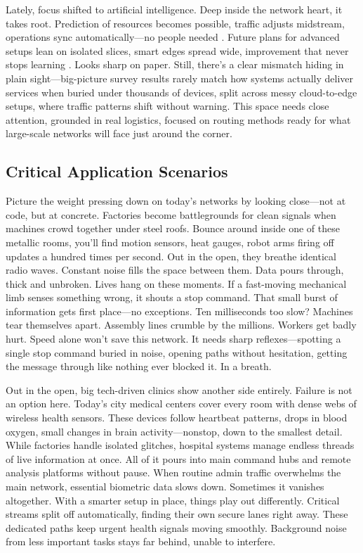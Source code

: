 \documentclass[a4paper,fleqn]{cas-dc}
\numberwithin{equation}{section}
\begin{document}
Lately, focus shifted to artificial intelligence. Deep inside the network heart, it takes root. Prediction of resources becomes possible, traffic adjusts midstream, operations sync automatically—no people needed \cite{Le2023Applications,Mokh2024LargeScaleAI}. Future plans for advanced setups lean on isolated slices, smart edges spread wide, improvement that never stops learning \cite{Ahmed2024Toward,Sefati2025Comprehensive}. Looks sharp on paper. Still, there's a clear mismatch hiding in plain sight—big-picture survey results rarely match how systems actually deliver services when buried under thousands of devices, split across messy cloud-to-edge setups, where traffic patterns shift without warning. This space needs close attention, grounded in real logistics, focused on routing methods ready for what large-scale networks will face just around the corner.

\subsection{Critical Application Scenarios}

Picture the weight pressing down on today's networks by looking close—not at code, but at concrete. Factories become battlegrounds for clean signals when machines crowd together under steel roofs. Bounce around inside one of these metallic rooms, you'll find motion sensors, heat gauges, robot arms firing off updates a hundred times per second. Out in the open, they breathe identical radio waves. Constant noise fills the space between them. Data pours through, thick and unbroken. Lives hang on these moments. If a fast-moving mechanical limb senses something wrong, it shouts a stop command. That small burst of information gets first place—no exceptions. Ten milliseconds too slow? Machines tear themselves apart. Assembly lines crumble by the millions. Workers get badly hurt. Speed alone won't save this network. It needs sharp reflexes—spotting a single stop command buried in noise, opening paths without hesitation, getting the message through like nothing ever blocked it. In a breath.

Out in the open, big tech-driven clinics show another side entirely. Failure is not an option here. Today's city medical centers cover every room with dense webs of wireless health sensors. These devices follow heartbeat patterns, drops in blood oxygen, small changes in brain activity—nonstop, down to the smallest detail. While factories handle isolated glitches, hospital systems manage endless threads of live information at once. All of it pours into main command hubs and remote analysis platforms without pause. When routine admin traffic overwhelms the main network, essential biometric data slows down. Sometimes it vanishes altogether. With a smarter setup in place, things play out differently. Critical streams split off automatically, finding their own secure lanes right away. These dedicated paths keep urgent health signals moving smoothly. Background noise from less important tasks stays far behind, unable to interfere.
\end{document}
